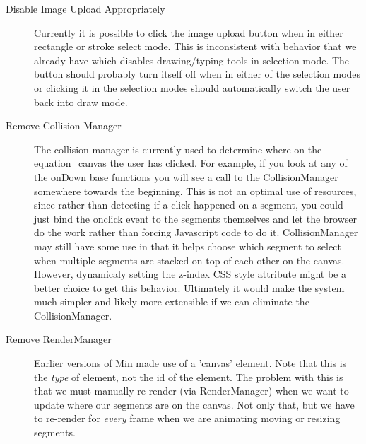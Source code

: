 \documentclass[letterpaper]{article}
\begin{document}
\begin{description}
    \item[Disable Image Upload Appropriately] Currently it is possible to click the image
        upload button when in either rectangle or stroke select mode. This is
        inconsistent with behavior that we already have which disables
        drawing/typing tools in selection mode. The button should probably turn
        itself off when in either of the selection modes or clicking it in the
        selection modes should automatically switch the user back into draw
        mode.
    \item[Remove Collision Manager] The collision manager is currently used to
        determine where on the equation\_canvas the user has clicked. For
        example, if you look at any of the onDown base functions you will see a
        call to the CollisionManager somewhere towards the beginning. This is
        not an optimal use of resources, since rather than detecting if a
        click happened on a segment, you could just bind the onclick event to
        the segments themselves and let the browser do the work rather than
        forcing Javascript code to do it. CollisionManager may still have some
        use in that it helps choose which segment to select when multiple
        segments are stacked on top of each other on the canvas. However,
        dynamicaly setting the z-index CSS style attribute might be a better
        choice to get this behavior. Ultimately it would make the system much
        simpler and likely more extensible if we can eliminate the
        CollisionManager.
    \item[Remove RenderManager] Earlier versions of Min made use of a 'canvas'
        element. Note that this is the \emph{type} of element, not the id of the
        element. The problem with this is that we must manually re-render (via
        RenderManager) when we want to update where our segments are on the
        canvas. Not only that, but we have to re-render for \emph{every} frame
        when we are animating moving or resizing segments. 
        

\end{description}
\end{document}
